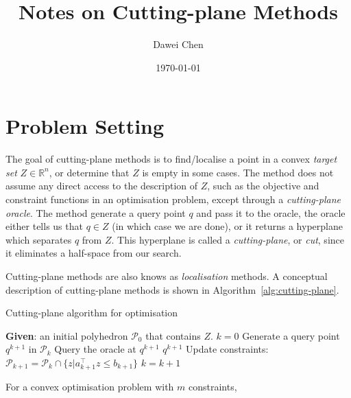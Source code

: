 \documentclass[twocolumn,a4wide,9pt]{extarticle}
\title{Notes on Cutting-plane Methods}
\author{Dawei Chen}
\date{\today}
\begin{document}
\maketitle

\section{Problem Setting}
\label{sec:problem}

The goal of cutting-plane methods is to find/localise a point in a convex \textit{target set} $Z \in \mathbb{R}^n$,
or determine that $Z$ is empty in some cases. 
The method does not assume any direct access to the description of $Z$,
such as the objective and constraint functions in an optimisation problem, except through a \textit{cutting-plane oracle}.
The method generate a query point $q$ and pass it to the oracle, 
the oracle either tells us that $q \in Z$ (in which case we are done), or it returns a hyperplane which separates $q$ from $Z$.
This hyperplane is called a \textit{cutting-plane}, or \textit{cut}, since it eliminates a half-space from our search.

Cutting-plane methods are also knows as \textit{localisation} methods. 
A conceptual description of cutting-plane methods is shown in Algorithm~\ref{alg:cutting-plane}.


\begin{algorithm}[htbp]
\caption{Cutting-plane algorithm for optimisation}
\label{alg:cutting-plane}
\begin{algorithmic}[1]
\STATE \textbf{Given}: an initial polyhedron $\mathcal{P}_0$ that contains $Z$.
\STATE $k = 0$
\REPEAT
    \STATE Generate a query point $q^{k+1}$ in $\mathcal{P}_k$
    \STATE Query the oracle at $q^{k+1}$
        \RETURN $q^{k+1}$
        \STATE Update constraints: $\mathcal{P}_{k+1} = \mathcal{P}_k \cap \{z | a_{k+1}^\top z \le b_{k+1} \}$
    \ENDIF
    \STATE $k = k + 1$
\end{algorithmic}
\end{algorithm}


For a convex optimisation problem with $m$ constraints,
\end{document}
